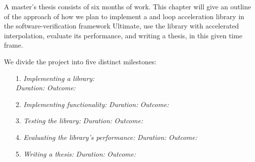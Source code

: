 A master's thesis consists of six months of work. This chapter will give an outline of the approach of how we plan to implement a \qvasr and \qvasrs loop acceleration library in the software-verification framework Ultimate, use the library with accelerated interpolation, evaluate its performance, and writing a thesis, in this given time frame. \\ \par
We divide the project into five distinct milestones:

\begin{itemize}
	\item[1.] \textsl{Implementing a \qvasr library:} \\
			  \textsl{Duration:}
			  \textsl{Outcome:}
	
	\item[2.] \textsl{Implementing \qvasrs functionality:}
			  \textsl{Duration:}
			  \textsl{Outcome:}

	\item[3.] \textsl{Testing the library:}
			  \textsl{Duration:}
			  \textsl{Outcome:}
	
	\item[4.] \textsl{Evaluating the library's performance:}
			  \textsl{Duration:}
			  \textsl{Outcome:}
	
	\item[5.] \textsl{Writing a thesis:}
			  \textsl{Duration:}
			  \textsl{Outcome:}
\end{itemize}
